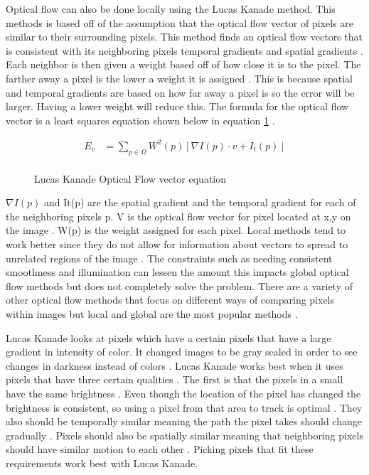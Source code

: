 \documentclass{article}
\begin{document}
  Optical flow can also be done locally using the Lucas Kanade method. This methods is based off of the assumption that the optical flow vector of pixels are similar to their surrounding pixels. This method finds an optical flow vectors that is consistent with its neighboring pixels temporal gradients and spatial gradients \cite{odonovan_optical_2005}. Each neighbor is then given a weight based off of how close it is to the pixel. The farther away a pixel is the lower a weight it is assigned \cite{odonovan_optical_2005}. This is because spatial and temporal gradients are based on how far away a pixel is so the error will be larger. Having a lower weight will reduce this. The formula for the optical flow vector is a least squares equation shown below in equation \ref{eq:lucaskanade} \cite{odonovan_optical_2005}.

      \begin{figure}
        \centering
        \begin{equation}
          \begin{split}
            E_v &= \sum_{p\in\Omega}W^2(p)[\nabla I(p)\cdot v + I_t(p)] \\
          \end{split}
        \end{equation}
        \caption{Lucas Kanade Optical Flow vector equation}
        \label{eq:lucaskanade}
      \end{figure}


    $\nabla I(p)$ and It(p) are the spatial gradient and the temporal gradient for each of the neighboring pixels p. V is the optical flow vector for pixel located at x,y on the image \cite{odonovan_optical_2005}. W(p) is the weight assigned for each pixel. Local methods tend to work better since they do not allow for information about vectors to spread to unrelated regions of the image \cite{odonovan_optical_2005}. The constraints such as needing consistent smoothness and illumination can lessen the amount this impacts global optical flow methods but does not completely solve the problem. There are a variety of other optical flow  methods that focus on different ways of comparing pixels within images but local and global are the most popular methods \cite{odonovan_optical_2005}.

	Lucas Kanade looks at pixels which have a certain pixels that have a large gradient in intensity of color\cite{sun_optical_nodate}. It changed images to be gray scaled in order to see changes in darkness instead of colors \cite{sun_optical_nodate}. Lucas Kanade works best when it uses pixels that have three certain qualities \cite{sun_optical_nodate}. The first is that the pixels in a small have the same brightness \cite{sun_optical_nodate}. Even though the location of the pixel has changed the brightness is consistent, so using a pixel from that area to track is optimal \cite{sun_optical_nodate}. They also should be temporally similar meaning the path the pixel takes should change gradually \cite{sun_optical_nodate}. Pixels should also be spatially similar meaning that neighboring pixels should have similar motion to each other \cite{sun_optical_nodate}. Picking pixels that fit these requirements work best with Lucas Kanade.
\end{document}
